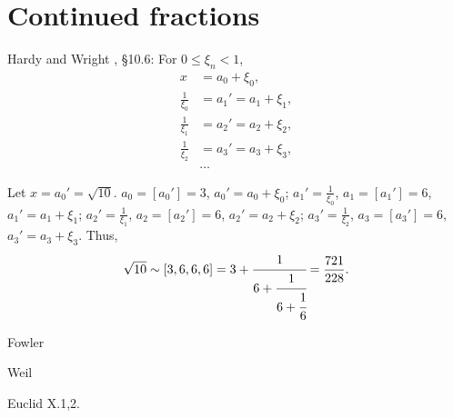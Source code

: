 \documentclass{amsart}
\theoremstyle{definition}
\begin{document}
\section{Continued fractions}
Hardy and Wright \cite{hardy}, \S 10.6: 
For $0 \leq \xi_n < 1$,
\begin{align*}
x&=a_0+\xi_0,\\
\frac{1}{\xi_0}&=a_1'=a_1+\xi_1,\\
\frac{1}{\xi_1}&=a_2'=a_2+\xi_2,\\
\frac{1}{\xi_2}&=a_3'=a_3+\xi_3,\\
&\ldots
\end{align*}

Let $x=a_0'=\sqrt{10}$. 
$a_0=[a_0']=3$, $a_0'=a_0+\xi_0$;
$a_1'=\frac{1}{\xi_0}$, $a_1=[a_1']=6$, $a_1'=a_1+\xi_1$;
$a_2'=\frac{1}{\xi_1}$, $a_2=[a_2']=6$, $a_2'=a_2+\xi_2$;
$a_3'=\frac{1}{\xi_2}$, $a_3=[a_3']=6$, $a_3'=a_3+\xi_3$.
Thus,
\[
\sqrt{10} \sim [3,6,6,6] = 3+\cfrac{1}{6+\cfrac{1}{6+\cfrac{1}{6}}}
=\frac{721}{228}.
\]

Fowler \cite{fowler}

Weil \cite{weil}


Euclid X.1,2.








\end{document}
